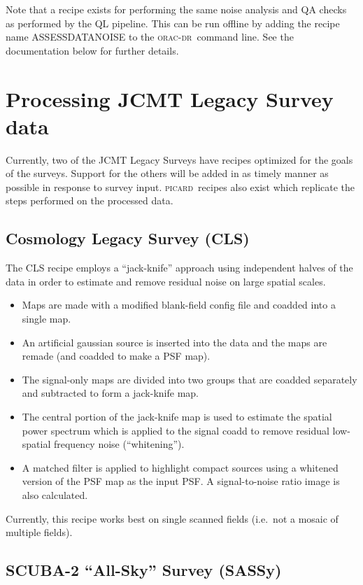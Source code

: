 \documentclass[twoside,11pt]{article}
\newcommand{\xlabel}[1]{}
\renewcommand{\_}{\texttt{\symbol{95}}}
\newcommand{\oracdr}{\textsc{orac-dr}}
\newcommand{\picard}{\textsc{picard}}
\begin{document}
Note that a recipe exists for performing the same noise analysis and
QA checks as performed by the QL pipeline. This can be run offline by
adding the recipe name ASSESS\_DATA\_NOISE to the \oracdr\ command
line. See the documentation below for further details.

\section{\xlabel{jlsrecipes}Processing JCMT Legacy Survey data\label{se:jlsrec}}

Currently, two of the JCMT Legacy Surveys have recipes optimized for
the goals of the surveys. Support for the others will be added in as
timely manner as possible in response to survey input. \picard\ recipes
also exist which replicate the steps performed on the processed data.

\subsection{Cosmology Legacy Survey (CLS)}

The CLS recipe employs a ``jack-knife'' approach using independent
halves of the data in order to estimate and remove residual noise on
large spatial scales.

\begin{itemize}
\item Maps are made with a modified blank-field config file and
  coadded into a single map.
\item An artificial gaussian source is inserted into the data and the
  maps are remade (and coadded to make a PSF map).
\item The signal-only maps are divided into two groups that are
  coadded separately and subtracted to form a jack-knife map.
\item The central portion of the jack-knife map is used to estimate
  the spatial power spectrum which is applied to the signal coadd to
  remove residual low-spatial frequency noise (``whitening'').
\item A matched filter is applied to highlight compact sources using a
  whitened version of the PSF map as the input PSF. A signal-to-noise
  ratio image is also calculated.
\end{itemize}

Currently, this recipe works best on single scanned fields (i.e.\ not
a mosaic of multiple fields).

\subsection{SCUBA-2 ``All-Sky'' Survey (SASSy)}
\end{document}
